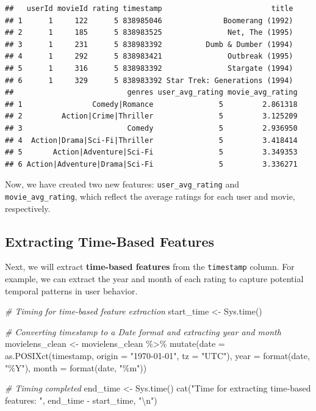 \documentclass[
]{article}
\newenvironment{Shaded}{}{}
\newcommand{\AttributeTok}[1]{\textcolor[rgb]{0.49,0.56,0.16}{#1}}
\newcommand{\CommentTok}[1]{\textcolor[rgb]{0.38,0.63,0.69}{\textit{#1}}}
\newcommand{\FunctionTok}[1]{\textcolor[rgb]{0.02,0.16,0.49}{#1}}
\newcommand{\NormalTok}[1]{#1}
\newcommand{\OtherTok}[1]{\textcolor[rgb]{0.00,0.44,0.13}{#1}}
\newcommand{\SpecialCharTok}[1]{\textcolor[rgb]{0.25,0.44,0.63}{#1}}
\newcommand{\StringTok}[1]{\textcolor[rgb]{0.25,0.44,0.63}{#1}}
\begin{document}
\begin{verbatim}
##   userId movieId rating timestamp                         title
## 1      1     122      5 838985046              Boomerang (1992)
## 2      1     185      5 838983525               Net, The (1995)
## 3      1     231      5 838983392          Dumb & Dumber (1994)
## 4      1     292      5 838983421               Outbreak (1995)
## 5      1     316      5 838983392               Stargate (1994)
## 6      1     329      5 838983392 Star Trek: Generations (1994)
##                          genres user_avg_rating movie_avg_rating
## 1                Comedy|Romance               5         2.861318
## 2         Action|Crime|Thriller               5         3.125209
## 3                        Comedy               5         2.936950
## 4  Action|Drama|Sci-Fi|Thriller               5         3.418414
## 5       Action|Adventure|Sci-Fi               5         3.349353
## 6 Action|Adventure|Drama|Sci-Fi               5         3.336271
\end{verbatim}

Now, we have created two new features: \texttt{user\_avg\_rating} and
\texttt{movie\_avg\_rating}, which reflect the average ratings for each
user and movie, respectively.

\subsection{Extracting Time-Based
Features}\label{extracting-time-based-features}

Next, we will extract \textbf{time-based features} from the
\texttt{timestamp} column. For example, we can extract the year and
month of each rating to capture potential temporal patterns in user
behavior.

\begin{Shaded}
\begin{Highlighting}[]
\CommentTok{\# Timing for time{-}based feature extraction}
\NormalTok{start\_time }\OtherTok{\textless{}{-}} \FunctionTok{Sys.time}\NormalTok{()}

\CommentTok{\# Converting timestamp to a Date format and extracting year and month}
\NormalTok{movielens\_clean }\OtherTok{\textless{}{-}}\NormalTok{ movielens\_clean }\SpecialCharTok{\%\textgreater{}\%}
  \FunctionTok{mutate}\NormalTok{(}\AttributeTok{date =} \FunctionTok{as.POSIXct}\NormalTok{(timestamp, }\AttributeTok{origin =} \StringTok{"1970{-}01{-}01"}\NormalTok{, }\AttributeTok{tz =} \StringTok{"UTC"}\NormalTok{),}
         \AttributeTok{year =} \FunctionTok{format}\NormalTok{(date, }\StringTok{"\%Y"}\NormalTok{),}
         \AttributeTok{month =} \FunctionTok{format}\NormalTok{(date, }\StringTok{"\%m"}\NormalTok{))}

\CommentTok{\# Timing completed}
\NormalTok{end\_time }\OtherTok{\textless{}{-}} \FunctionTok{Sys.time}\NormalTok{()}
\FunctionTok{cat}\NormalTok{(}\StringTok{"Time for extracting time{-}based features: "}\NormalTok{, end\_time }\SpecialCharTok{{-}}\NormalTok{ start\_time, }\StringTok{"}\SpecialCharTok{\textbackslash{}n}\StringTok{"}\NormalTok{)}
\end{Highlighting}
\end{Shaded}
\end{document}
